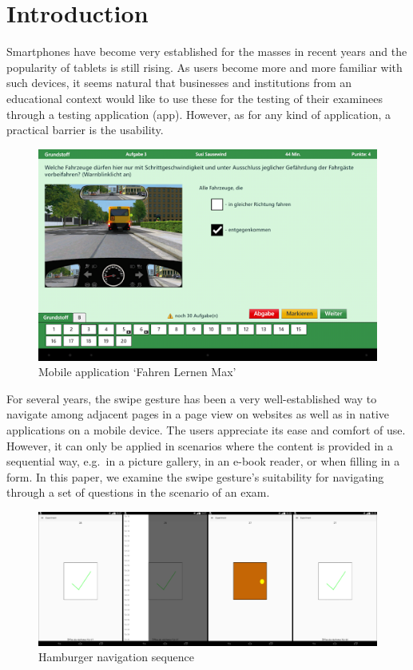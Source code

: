 \documentclass{sig-alternate-05-2015}
\begin{document}
\section{Introduction}
Smartphones have become very established for the masses in recent years and the popularity of tablets is
still rising. As users become more and more familiar with such devices, it seems natural that businesses and institutions
from an educational context would like to use these for the testing of their examinees through a testing application (app).
However, as for any kind of application, a practical barrier is the usability.
\begin{figure}[h]
	\includegraphics[width=\columnwidth]{drivinglicense.png}
	\caption{Mobile application `Fahren Lernen Max'}\label{fig:fahren_lernen}
\end{figure}
For several years, the swipe gesture has been a very well-established way to
navigate among adjacent pages in a page view on websites as well as in native applications on a mobile device. The users appreciate its ease and comfort of use. However,
it can only be applied in scenarios where the content is provided in a
sequential way, e.g.\ in a picture gallery, in an e-book reader, or when
filling in a form. In this paper, we examine the swipe gesture's suitability
for navigating through a set of questions in the scenario of an exam.
\begin{figure}[!h]
	\centering
	\includegraphics[width=\linewidth]{pics/screenshots/sequence}
	\caption{Hamburger navigation sequence}\label{fig:sequence}
\end{figure}
\end{document}
